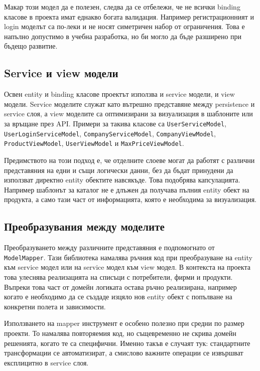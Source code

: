 Макар този модел да е полезен, следва да се отбележи, че не всички binding класове в проекта имат еднакво богата валидация. Например регистрационният и login моделът са по-леки и не носят симетричен набор от ограничения. Това е напълно допустимо в учебна разработка, но би могло да бъде разширено при бъдещо развитие.

\subsection{Service и view модели}

Освен entity и binding класове проектът използва и service модели, и view модели. Service моделите служат като вътрешно представяне между persistence и service слоя, а view моделите са оптимизирани за визуализация в шаблоните или за връщане през API. Примери за такива класове са \texttt{UserServiceModel}, \texttt{UserLoginServiceModel}, \texttt{CompanyServiceModel}, \texttt{CompanyViewModel}, \texttt{ProductViewModel}, \texttt{UserViewModel} и \texttt{MaxPriceViewModel}.

Предимството на този подход е, че отделните слоеве могат да работят с различни представяния на едни и същи логически данни, без да бъдат принудени да използват директно entity обектите навсякъде. Това подобрява капсулацията. Например шаблонът за каталог не е длъжен да получава пълния entity обект на продукта, а само тази част от информацията, която е необходима за визуализация.

\subsection{Преобразувания между моделите}

Преобразуването между различните представяния е подпомогнато от \texttt{ModelMapper}. Тази библиотека намалява ръчния код при преобразуване на entity към service модел или на service модел към view модел. В контекста на проекта това улеснява реализацията на списъци с потребители, фирми и продукти. Въпреки това част от домейн логиката остава ръчно реализирана, например когато е необходимо да се създаде изцяло нов entity обект с попълване на конкретни полета и зависимости.

Използването на mapper инструмент е особено полезно при средни по размер проекти. То намалява повторяемия код, но същевременно не скрива домейн решенията, когато те са специфични. Именно такъв е случаят тук: стандартните трансформации се автоматизират, а смислово важните операции се извършват експлицитно в service слоя.

